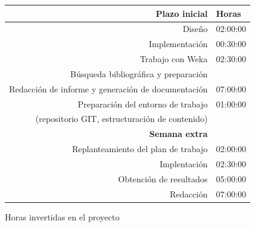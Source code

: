 \documentclass[a4paper]{report}
\begin{document}
	\begin{figure}[htbp]
	
		\begin{center}
			\begin{tabular}{|r|r|}
				\hline
				\textbf{Plazo inicial} & \multicolumn{1}{l|}{\textbf{Horas}} \\ \hline
				Diseño & 02:00:00 \\ \hline
				Implementación & 00:30:00 \\ \hline
				Trabajo con Weka & 02:30:00 \\ \hline
				Búsqueda bibliográfica y preparación & \multicolumn{1}{l|}{} \\ \hline
				Redacción de informe y generación de documentación & 07:00:00 \\ \hline
				Preparación del entorno de trabajo & 01:00:00 \\
				(repositorio GIT, estructuración de contenido) & \multicolumn{1}{l|}{} \\ \hline
				\textbf{Semana extra} & \multicolumn{1}{l|}{} \\ \hline
				Replanteamiento del plan de trabajo & 02:00:00 \\ \hline
				Implentación & 02:30:00 \\ \hline
				Obtención de resultados & 05:00:00 \\ \hline
				Redacción & 07:00:00 \\ \hline
			\end{tabular}
		\end{center}
			\caption{Horas invertidas en el proyecto}
		\label{horas}
	\end{figure}
	
\end{document}
